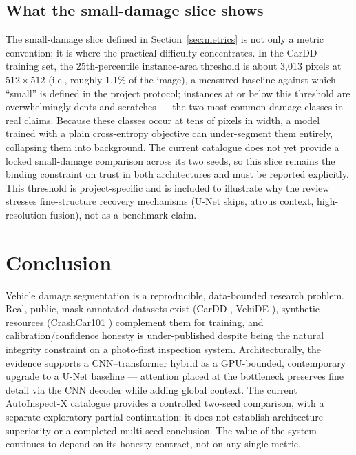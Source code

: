 \documentclass[conference]{IEEEtran}
\begin{document}
\subsection{What the small-damage slice shows}
The small-damage slice defined in Section~\ref{sec:metrics} is not only a metric
convention; it is where the practical difficulty concentrates. In the CarDD
training set, the 25th-percentile instance-area threshold is about 3,013
pixels at $512\times512$ (i.e., roughly 1.1\% of the image), a measured baseline
against which ``small'' is defined in the project protocol; instances at or below
this threshold are overwhelmingly dents and scratches --- the two most common
damage classes in real claims. Because these classes occur at tens of pixels in
width, a model trained with a plain cross-entropy objective can under-segment
them entirely, collapsing them into background. The current catalogue does not
yet provide a locked small-damage comparison across its two seeds, so this slice
remains the binding constraint on trust in both architectures and must be
reported explicitly. This threshold is project-specific and is included to
illustrate why the review stresses fine-structure recovery mechanisms (U-Net
skips, atrous context, high-resolution fusion), not as a benchmark claim.

\section{Conclusion}
Vehicle damage segmentation is a reproducible, data-bounded research problem.
Real, public, mask-annotated datasets exist (CarDD \cite{cardd2023}, VehiDE
\cite{vehide2023}), synthetic resources (CrashCar101 \cite{crashcar101})
complement them for training, and calibration/confidence honesty is
under-published despite being the natural integrity constraint on a photo-first
inspection system. Architecturally, the evidence supports a CNN--transformer
hybrid as a GPU-bounded, contemporary upgrade to a U-Net baseline --- attention
placed at the bottleneck preserves fine detail via the CNN decoder while adding
global context. The current AutoInspect-X catalogue provides a controlled
two-seed comparison, with a separate exploratory partial continuation; it does
not establish architecture superiority or a completed multi-seed conclusion.
The value of the system continues to depend on its honesty contract, not on any
single metric.
\end{document}
